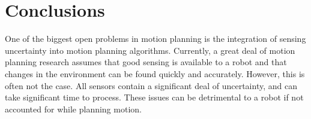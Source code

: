 \documentclass[10pt,conference]{ieeeconf}
\begin{document}
\section{Conclusions} \label{sec:conclusion}
    
    One of the biggest open problems in motion planning is the integration of sensing uncertainty into motion planning algorithms. Currently, a great deal of motion planning research assumes that good sensing is available to a robot and that changes in the environment can be found quickly and accurately. However, this is often not the case. All sensors contain a significant deal of uncertainty, and can take significant time to process. These issues can be detrimental to a robot if not accounted for while planning motion. 
    
    
    
    
    
    
    
    
    
    
\end{document}
